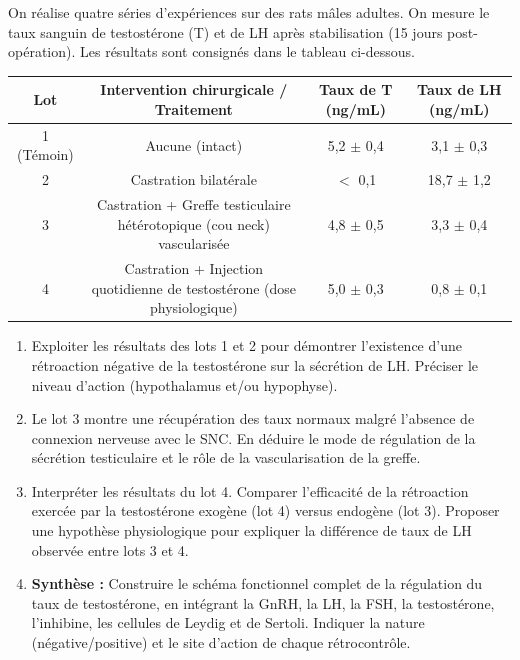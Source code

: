 \documentclass[11pt]{article}
\begin{document}
\begin{exercice}
On réalise quatre séries d'expériences sur des rats mâles adultes. On mesure le taux sanguin de testostérone (T) et de LH après stabilisation (15 jours post-opération). Les résultats sont consignés dans le tableau ci-dessous.

\begin{tabular}{|c|c|c|c|}
\hline
\textbf{Lot} & \textbf{Intervention chirurgicale / Traitement} & \textbf{Taux de T (ng/mL)} & \textbf{Taux de LH (ng/mL)} \\
\hline
1 (Témoin) & Aucune (intact) & 5,2 $\pm$ 0,4 & 3,1 $\pm$ 0,3 \\
\hline
2 & Castration bilatérale & $<$ 0,1 & 18,7 $\pm$ 1,2 \\
\hline
3 & Castration + Greffe testiculaire hétérotopique (cou neck) vascularisée & 4,8 $\pm$ 0,5 & 3,3 $\pm$ 0,4 \\
\hline
4 & Castration + Injection quotidienne de testostérone (dose physiologique) & 5,0 $\pm$ 0,3 & 0,8 $\pm$ 0,1 \\
\hline
\end{tabular}

\begin{enumerate}
    \item Exploiter les résultats des lots 1 et 2 pour démontrer l'existence d'une rétroaction négative de la testostérone sur la sécrétion de LH. Préciser le niveau d'action (hypothalamus et/ou hypophyse).
    \item Le lot 3 montre une récupération des taux normaux malgré l'absence de connexion nerveuse avec le SNC. En déduire le mode de régulation de la sécrétion testiculaire et le rôle de la vascularisation de la greffe.
    \item Interpréter les résultats du lot 4. Comparer l'efficacité de la rétroaction exercée par la testostérone exogène (lot 4) versus endogène (lot 3). Proposer une hypothèse physiologique pour expliquer la différence de taux de LH observée entre lots 3 et 4.
    \item \textbf{Synthèse :} Construire le schéma fonctionnel complet de la régulation du taux de testostérone, en intégrant la GnRH, la LH, la FSH, la testostérone, l'inhibine, les cellules de Leydig et de Sertoli. Indiquer la nature (négative/positive) et le site d'action de chaque rétrocontrôle.
\end{enumerate}
\end{exercice}
\end{document}

